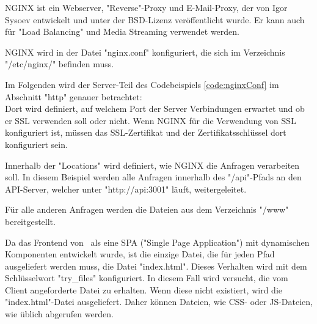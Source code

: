 

NGINX ist ein Webserver, "Reverse"-Proxy und E-Mail-Proxy, der von Igor Sysoev entwickelt und unter der BSD-Lizenz veröffentlicht wurde. 
Er kann auch für "Load Balancing" und Media Streaming verwendet werden.
\cite{WikiNginx}
\cite{nginx}

NGINX wird in der Datei "nginx.conf" konfiguriert, die sich im Verzeichnis \linebreak \mbox{\ttfamily "/etc/nginx/"} befinden muss. 


Im Folgenden wird der Server-Teil des Codebeispiels \ref{code:nginxConf} im Abschnitt "{\ttfamily http}" genauer betrachtet: \\
Dort wird definiert, auf welchem Port der Server Verbindungen erwartet und ob er SSL verwenden soll oder nicht. 
Wenn NGINX für die Verwendung von SSL konfiguriert ist, müssen das SSL-Zertifikat und der Zertifikatsschlüssel dort konfiguriert sein.

Innerhalb der "Locations" wird definiert, wie NGINX die Anfragen verarbeiten soll. In diesem Beispiel werden alle Anfragen innerhalb des "{\ttfamily /api}"-Pfads an den API-Server, welcher unter \mbox{"{\ttfamily http://api:3001}"} läuft, weitergeleitet.

Für alle anderen Anfragen werden die Dateien aus dem Verzeichnis "{\ttfamily /www}" bereitgestellt. 

Da das Frontend von \ZELIA\ als eine SPA ("Single Page Application") mit dynamischen Komponenten entwickelt wurde, ist die einzige Datei, die für jeden Pfad ausgeliefert werden muss, die Datei "{\ttfamily index.html}". 
Dieses Verhalten wird mit dem Schlüsselwort "{\ttfamily try\_files}" konfiguriert. 
In diesem Fall wird versucht, die vom Client angeforderte Datei zu erhalten. 
Wenn diese nicht existiert, wird die "{\ttfamily index.html}"-Datei ausgeliefert. 
Daher können Dateien, wie CSS- oder JS-Dateien, wie üblich abgerufen werden.

